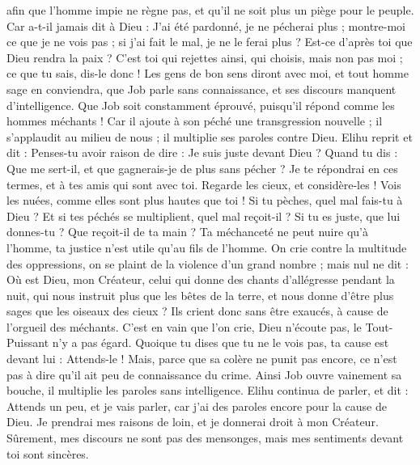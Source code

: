 \begin{multicols}{2}
afin que l'homme impie ne règne pas, et qu'il ne soit plus un piège pour le peuple.
Car a-t-il jamais dit à Dieu : J'ai été pardonné, je ne pécherai plus ;
montre-moi ce que je ne vois pas ; si j'ai fait le mal, je ne le ferai plus ?
Est-ce d'après toi que Dieu rendra la paix ? C'est toi qui rejettes ainsi, qui choisis, mais non pas moi ; ce que tu sais, dis-le donc !
Les gens de bon sens diront avec moi, et tout homme sage en conviendra,
que Job parle sans connaissance, et ses discours manquent d'intelligence.
Que Job soit constamment éprouvé, puisqu'il répond comme les hommes méchants !
Car il ajoute à son péché une transgression nouvelle ; il s'applaudit au milieu de nous ; il multiplie ses paroles contre Dieu.
\VerseOne{}Elihu reprit et dit :
Penses-tu avoir raison de dire : Je suis juste devant Dieu ?
Quand tu dis : Que me sert-il, et que gagnerais-je de plus sans pécher ?
Je te répondrai en ces termes, et à tes amis qui sont avec toi.
Regarde les cieux, et considère-les ! Vois les nuées, comme elles sont plus hautes que toi !
Si tu pèches, quel mal fais-tu à Dieu ? Et si tes péchés se multiplient, quel mal reçoit-il ?
Si tu es juste, que lui donnes-tu ? Que reçoit-il de ta main ?
Ta méchanceté ne peut nuire qu'à l'homme, ta justice n'est utile qu'au fils de l'homme.
On crie contre la multitude des oppressions, on se plaint de la violence d'un grand nombre ;
mais nul ne dit : Où est Dieu, mon Créateur, celui qui donne des chants d'allégresse pendant la nuit,
qui nous instruit plus que les bêtes de la terre, et nous donne d'être plus sages que les oiseaux des cieux ?
Ils crient donc sans être exaucés, à cause de l'orgueil des méchants.
C'est en vain que l'on crie, Dieu n'écoute pas, le Tout-Puissant n'y a pas égard.
Quoique tu dises que tu ne le vois pas, ta cause est devant lui : Attends-le !
Mais, parce que sa colère ne punit pas encore, ce n'est pas à dire qu'il ait peu de connaissance du crime.
Ainsi Job ouvre vainement sa bouche, il multiplie les paroles sans intelligence.
\VerseOne{}Elihu continua de parler, et dit :
Attends un peu, et je vais parler, car j'ai des paroles encore pour la cause de Dieu.
Je prendrai mes raisons de loin, et je donnerai droit à mon Créateur.
Sûrement, mes discours ne sont pas des mensonges, mais mes sentiments devant toi sont sincères.

\end{multicols}
